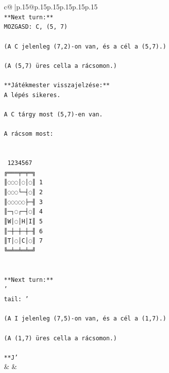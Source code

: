 \documentclass{article}
\begin{document}
{\begin{supertabular}{c@{$\;$}|p{.15\linewidth}@{}p{.15\linewidth}p{.15\linewidth}p{.15\linewidth}p{.15\linewidth}p{.15\linewidth}}
{{{\\ 
\texttt{**Next turn:**  } \\
\texttt{MOZGASD: C, (5, 7)  } \\
\\ 
\texttt{(A C jelenleg (7,2){-}on van, és a cél a (5,7).)  } \\
\\ 
\texttt{(A (5,7) üres cella a rácsomon.)  } \\
\\ 
\texttt{**Játékmester visszajelzése:**  } \\
\texttt{A lépés sikeres.  } \\
\\ 
\texttt{A C tárgy most (5,7){-}en van.  } \\
\\ 
\texttt{A rácsom most:  } \\
\\ 
\\ 
\texttt{ 1234567} \\
\texttt{╔═══╤═╤═╗} \\
\texttt{║◌◌◌│◌│◌║ 1} \\
\texttt{║◌◌◌└─┤◌║ 2} \\
\texttt{║◌◌◌◌◌├─╢ 3} \\
\texttt{║─┐◌┌─┤◌║ 4} \\
\texttt{║W│◌│H│I║ 5} \\
\texttt{║─┼─┼─┼─╢ 6} \\
\texttt{║T│◌│C│◌║ 7} \\
\texttt{╚═╧═╧═╧═╝} \\
\\ 
\\ 
\texttt{**Next turn:**  } \\
\texttt{'} \\
\texttt{tail: '  } \\
\\ 
\texttt{(A I jelenleg (7,5){-}on van, és a cél a (1,7).)  } \\
\\ 
\texttt{(A (1,7) üres cella a rácsomon.)  } \\
\\ 
\texttt{**J'} \\
            }
        }
    }
    & & \\ \\


\end{supertabular}}
\end{document}
